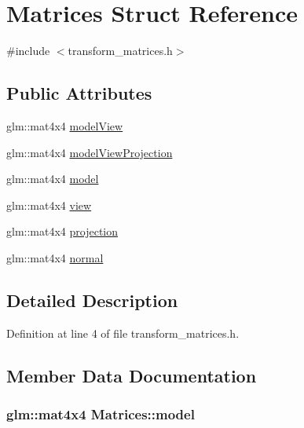 \hypertarget{struct_matrices}{}\section{Matrices Struct Reference}
\label{struct_matrices}


{\ttfamily \#include $<$transform\+\_\+matrices.\+h$>$}

\subsection*{Public Attributes}
\begin{DoxyCompactItemize}
\item 
glm\+::mat4x4 \hyperlink{struct_matrices_a55eeaf59b817be66d2149f5e131f8de3}{model\+View}
\item 
glm\+::mat4x4 \hyperlink{struct_matrices_a42af8cc09c21dbba6c3284291d2dba61}{model\+View\+Projection}
\item 
glm\+::mat4x4 \hyperlink{struct_matrices_af7523266e69ac370269472837fd6cacf}{model}
\item 
glm\+::mat4x4 \hyperlink{struct_matrices_af1345e145e678b3430cb794fb25b86ce}{view}
\item 
glm\+::mat4x4 \hyperlink{struct_matrices_a39c06d4402c7e41b394a74790934fc53}{projection}
\item 
glm\+::mat4x4 \hyperlink{struct_matrices_ae02f038cdeb0852e4235ab59d111337e}{normal}
\end{DoxyCompactItemize}


\subsection{Detailed Description}


Definition at line 4 of file transform\+\_\+matrices.\+h.



\subsection{Member Data Documentation}
\hypertarget{struct_matrices_af7523266e69ac370269472837fd6cacf}{}
\subsubsection[{model}]{\setlength{\rightskip}{0pt plus 5cm}glm\+::mat4x4 Matrices\+::model}\label{struct_matrices_af7523266e69ac370269472837fd6cacf}


